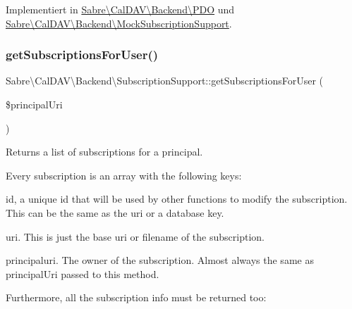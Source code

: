 Implementiert in \mbox{\hyperlink{class_sabre_1_1_cal_d_a_v_1_1_backend_1_1_p_d_o_a488f713803707880811da6f25e91f8fd}{Sabre\textbackslash{}\+Cal\+D\+A\+V\textbackslash{}\+Backend\textbackslash{}\+P\+DO}} und \mbox{\hyperlink{class_sabre_1_1_cal_d_a_v_1_1_backend_1_1_mock_subscription_support_a5172791acb23c4690d2991a86e898e9f}{Sabre\textbackslash{}\+Cal\+D\+A\+V\textbackslash{}\+Backend\textbackslash{}\+Mock\+Subscription\+Support}}.

\mbox{\label{interface_sabre_1_1_cal_d_a_v_1_1_backend_1_1_subscription_support_ae57d04c00b532488fe930f2119b4eb5c}} 
\subsubsection{\texorpdfstring{get\+Subscriptions\+For\+User()}{getSubscriptionsForUser()}}
{\footnotesize\ttfamily Sabre\textbackslash{}\+Cal\+D\+A\+V\textbackslash{}\+Backend\textbackslash{}\+Subscription\+Support\+::get\+Subscriptions\+For\+User (\begin{DoxyParamCaption}\item[{}]{\$principal\+Uri }\end{DoxyParamCaption})}

Returns a list of subscriptions for a principal.

Every subscription is an array with the following keys\+:
\begin{DoxyItemize}
\item id, a unique id that will be used by other functions to modify the subscription. This can be the same as the uri or a database key.
\item uri. This is just the \textquotesingle{}base uri\textquotesingle{} or \textquotesingle{}filename\textquotesingle{} of the subscription.
\item principaluri. The owner of the subscription. Almost always the same as principal\+Uri passed to this method.
\end{DoxyItemize}

Furthermore, all the subscription info must be returned too\+:



